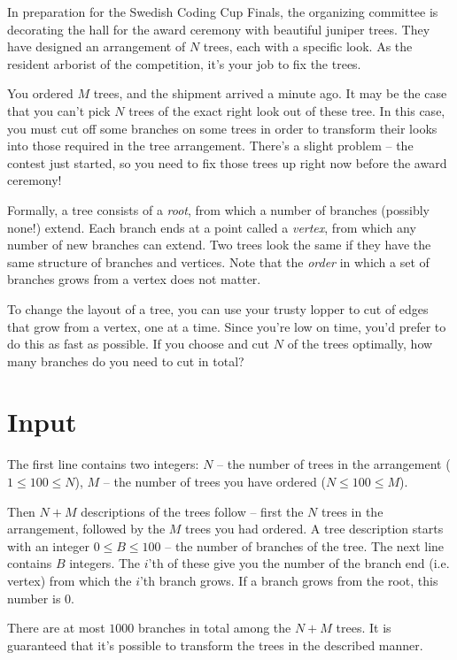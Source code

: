 In preparation for the Swedish Coding Cup Finals, the organizing committee is decorating the hall for the award ceremony with beautiful juniper trees.
They have designed an arrangement of $N$ trees, each with a specific look.
As the resident arborist of the competition, it's your job to fix the trees.

You ordered $M$ trees, and the shipment arrived a minute ago.
It may be the case that you can't pick $N$ trees of the exact right look out of these tree.
In this case, you must cut off some branches on some trees in order to transform their looks into those required in the tree arrangement.
There's a slight problem -- the contest just started, so you need to fix those trees up right now before the award ceremony!

Formally, a tree consists of a \emph{root}, from which a number of branches (possibly none!) extend.
Each branch ends at a point called a \emph{vertex}, from which any number of new branches can extend.
Two trees look the same if they have the same structure of branches and vertices.
Note that the \emph{order} in which a set of branches grows from a vertex does not matter.

To change the layout of a tree, you can use your trusty lopper to cut of edges that grow from a vertex, one at a time.
Since you're low on time, you'd prefer to do this as fast as possible.
If you choose and cut $N$ of the trees optimally, how many branches do you need to cut in total?

\section*{Input}
The first line contains two integers:
  $N$ -- the number of trees in the arrangement ($1 \le 100 \le N$),
  $M$ -- the number of trees you have ordered ($N \le 100 \le M$).

Then $N + M$ descriptions of the trees follow -- first the $N$ trees in the arrangement, followed by the $M$ trees you had ordered.
A tree description starts with an integer $0 \le B \le 100$ -- the number of branches of the tree.
The next line contains $B$ integers.
The $i$'th of these give you the number of the branch end (i.e. vertex) from which the $i$'th branch grows.
If a branch grows from the root, this number is $0$.

There are at most $1000$ branches in total among the $N + M$ trees.
It is guaranteed that it's possible to transform the trees in the described manner.

